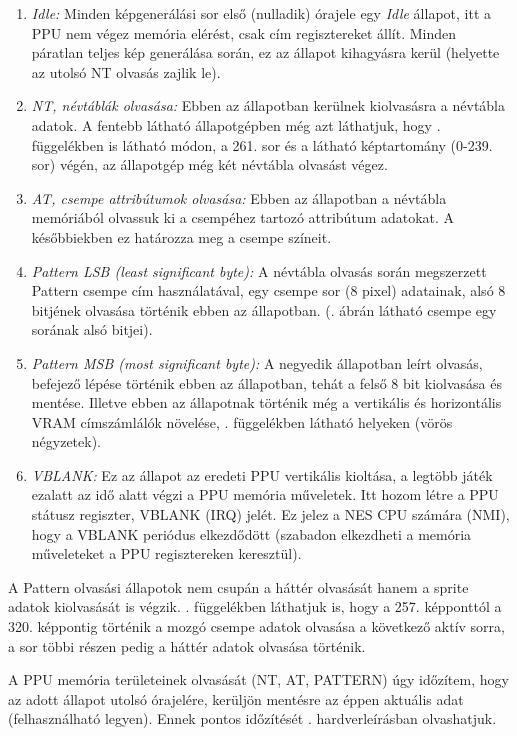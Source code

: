 	\begin{enumerate}
		\item \emph{Idle:} Minden képgenerálási sor első (nulladik) órajele egy \emph{Idle} állapot, itt a PPU nem végez memória elérést, csak cím regisztereket állít. Minden páratlan teljes kép generálása során, ez az állapot kihagyásra kerül (helyette az utolsó NT olvasás zajlik le).
		\item \emph{NT, névtáblák olvasása:} Ebben az állapotban kerülnek kiolvasásra a névtábla adatok. A fentebb látható állapotgépben még azt láthatjuk, hogy . függelékben is látható módon, a 261. sor és a látható képtartomány (0-239. sor) végén, az állapotgép még két névtábla olvasást végez. %
		\item \emph{AT, csempe attribútumok olvasása:} Ebben az állapotban a névtábla memóriából olvassuk ki a csempéhez tartozó attribútum adatokat. A későbbiekben ez határozza meg a csempe színeit.
		\item\emph{Pattern LSB (least significant byte):} A névtábla olvasás során megszerzett Pattern csempe cím használatával, egy csempe sor (8 pixel) adatainak, alsó 8 bitjének olvasása történik ebben az állapotban. (. ábrán látható csempe egy sorának alsó bitjei).
		\item \emph{Pattern MSB (most significant byte):} A negyedik állapotban leírt olvasás, befejező lépése történik ebben az állapotban, tehát a felső 8 bit kiolvasása és mentése. Illetve ebben az állapotnak történik még a vertikális és horizontális VRAM címszámlálók növelése, . függelékben látható helyeken (vörös négyzetek).
		\item \emph{VBLANK:} Ez az állapot az eredeti PPU vertikális kioltása, a legtöbb játék ezalatt az idő alatt végzi a PPU memória műveletek. Itt hozom létre a PPU státusz regiszter, VBLANK (IRQ) jelét. Ez jelez a NES CPU számára (NMI), hogy a VBLANK periódus elkezdődött (szabadon elkezdheti a memória műveleteket a PPU regisztereken keresztül). 
	\end{enumerate} 
	
	A Pattern olvasási állapotok nem csupán a háttér olvasását hanem a sprite adatok kiolvasását is végzik. . függelékben láthatjuk is, hogy a 257. képponttól a 320. képpontig történik a mozgó csempe adatok olvasása a következő aktív sorra, a sor többi részen pedig a háttér adatok olvasása történik.
	
	A PPU memória területeinek olvasását (NT, AT, PATTERN) úgy időzítem, hogy az adott állapot utolsó órajelére, kerüljön mentésre az éppen aktuális adat (felhasználható legyen). Ennek pontos időzítését . hardverleírásban olvashatjuk.
	
